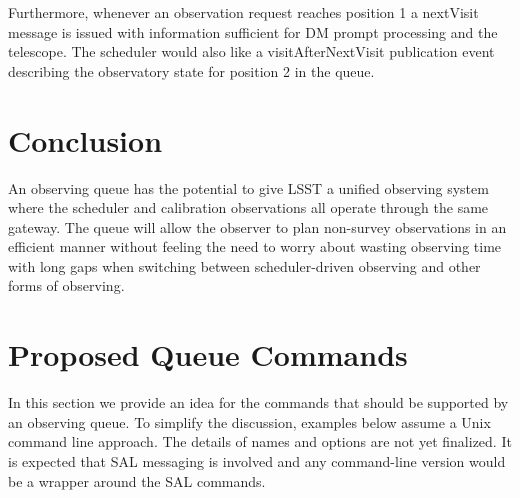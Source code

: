 \documentclass[TS,toc,lsstdraft]{lsstdoc}
\begin{document}
Furthermore, whenever an observation request reaches position 1 a nextVisit message is issued with information sufficient for DM prompt processing and the telescope.
The scheduler would also like a visitAfterNextVisit publication event describing the observatory state for position 2 in the queue.

\section{Conclusion}

An observing queue has the potential to give LSST a unified observing system where the scheduler and calibration observations all operate through the same gateway.
The queue will allow the observer to plan non-survey observations in an efficient manner without feeling the need to worry about wasting observing time with long gaps when switching between scheduler-driven observing and other forms of observing.

\appendix
\section{Proposed Queue Commands}

In this section we provide an idea for the commands that should be supported by an observing queue.
To simplify the discussion, examples below assume a Unix command line approach.
The details of names and options are not yet finalized.
It is expected that SAL messaging is involved and any command-line version would be a wrapper around the SAL commands.
\end{document}
